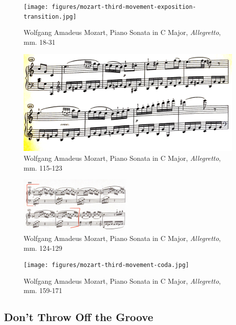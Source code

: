\begin{figure}
  	\centering
  	\texttt{[image: figures/mozart-third-movement-exposition-transition.jpg]}
  	\caption{Wolfgang Amadeus Mozart, Piano Sonata in C Major, \textit{Allegretto}, mm. 18-31}
  	\label{fig:mozart-third-movement-exposition-transition}
\end{figure}

\begin{figure}
	\centering
	\includegraphics[width=\textwidth]{figures/mozart-third-movement-bars-116-123.jpg}
	\caption{Wolfgang Amadeus Mozart, Piano Sonata in C Major, \textit{Allegretto}, mm. 115-123}
	\label{fig:mozart-third-movement-bars-116-123}
\end{figure}

\begin{figure}
	\centering
	\includegraphics[width=0.5\textwidth]{figures/mozart-third-movement-bars-124-129.jpg}
	\caption{Wolfgang Amadeus Mozart, Piano Sonata in C Major, \textit{Allegretto}, mm. 124-129}
	\label{fig:mozart-third-movement-bars-124-129}
\end{figure}

\begin{figure}
    \centering
    \texttt{[image: figures/mozart-third-movement-coda.jpg]}
    \caption{Wolfgang Amadeus Mozart, Piano Sonata in C Major, \textit{Allegretto}, mm. 159-171}
    \label{fig:mozart-third-movement-coda}
\end{figure}

\subsection{Don't Throw Off the Groove}


